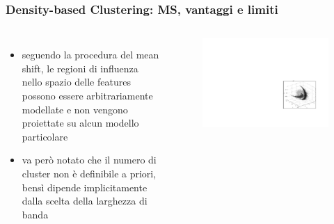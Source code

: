 \begin{frame}

	\frametitle{{\color{GradientDescentDiagramRed}Density-based Clustering}: MS, vantaggi e limiti}


		\begin{columns}

			\begin{itemize}
				\item seguendo la procedura del mean shift, le regioni di influenza nello spazio delle features possono essere arbitrariamente modellate e non vengono proiettate su alcun modello particolare
				\item va però notato che il numero di cluster non è definibile a priori, bensì dipende implicitamente dalla scelta della larghezza di banda
			\end{itemize}
			\begin{figure}[!htbp]
				\centering
				\includegraphics[width=1.0\linewidth]{images/unsupervised/non_parametric/meanshift_number_of_clusters.pdf}
			\end{figure}


		\end{columns}


\end{frame}
